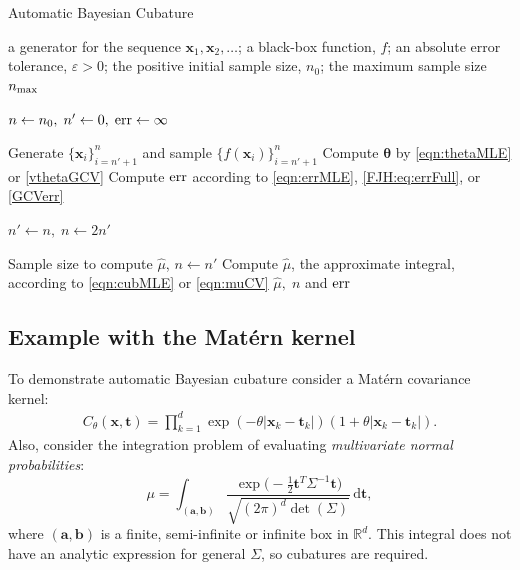 \documentclass[twocolumn]{svjour3}          %
\newcommand{\bm}[1]{\boldsymbol{#1}}
\newcommand{\mSigma}{\mathsf{\Sigma}}
\newcommand{\dif}[1]{\text{d}{#1}}
\newcommand{\reals}{\mathbb{R}}
\newcommand{\vtheta}{{\bm{\theta}}}
\newcommand{\va}{\bm{a}}
\newcommand{\vb}{\bm{b}}
\newcommand{\vt}{\bm{t}}
\newcommand{\vx}{\bm{x}}
\newcommand{\dvt}{\dif{\bm{t}}}
\newcommand{\hmu}{\widehat{\mu}}
\newcommand{\err}{\textup{err}}
\begin{document}
\begin{algorithm}
\caption{Automatic Bayesian Cubature}\label{algorithm1}
  \begin{algorithmic}[1]
  	\Require a generator for the sequence
  	$\vx_1, \vx_2, \ldots$; 
  	a black-box function, $f$; 
  	an absolute error tolerance,
  	$\varepsilon>0$; the positive initial sample size, $n_0$;
  	the maximum sample size $n_{\textup{max}}$
  	
      \State $n \gets n_0, \; n' \gets 0, \; \err \gets \infty$
      
      \While{$\err > \varepsilon$ and $n \le n_{\textup{max}}$}
      
        \State\label{LoopStart}Generate $\{ \vx_i\}_{i=n' + 1}^{n}$ and sample $\{f(\vx_i)\}_{i=n'+1}^{n}$
        \State Compute $\vtheta$ by \eqref{eqn:thetaMLE} or \eqref{vthetaGCV}
        \State Compute $\err$  according to \eqref{eqn:errMLE}, \eqref{FJH:eq:errFull}, or \eqref{GCVerr}
        
       	\State	$n' \gets n, \; n \gets 2n'$
        
        \EndWhile
        
        \State Sample size to compute $\hmu$, $n \gets n'$
        \State Compute $\hmu$, the approximate integral,   according to \eqref{eqn:cubMLE} or \eqref{eqn:muCV}
      \State \Return $\hmu, \; n$  and $\err$
  \end{algorithmic}
\end{algorithm}

\subsection{Example with the Mat\'ern kernel} \label{MVN_example}

To demonstrate automatic Bayesian cubature consider a Mat\'ern covariance kernel:
\begin{align*}
C_{\theta}(\vx, \vt) = \prod_{k=1}^d \exp(-\theta|\vx_k-\vt_k|)(1+\theta |\vx_k-\vt_k|).
\end{align*}
Also, consider the integration problem of evaluating  \emph{multivariate normal probabilities}:
\begin{equation}
\label{eqn:GaussDef}
\mu = \int_{(\va,\vb)} \frac{\exp\bigl(- \frac 12 \vt^T \mSigma^{-1} \vt \bigr)}{\sqrt{(2 \pi)^d \det(\mSigma)}} \, \dvt,
\end{equation}
where $(\va,\vb)$ is a finite, semi-infinite or infinite box in $\reals^d$.  This integral does not have an analytic expression for general $\mSigma$, so cubatures are required.  
\end{document}
